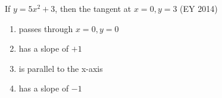     \item If $y=5x^{2}+3$, then the tangent at $x=0, y=3$
    \hfill (EY 2014)
    \begin{multicols}{2}
    \begin{enumerate}
        \item passes through $x=0, y=0$
        \item has a slope of $+1$
        \item is parallel to the x-axis
        \item has a slope of $-1$
    \end{enumerate}
    \end{multicols}
